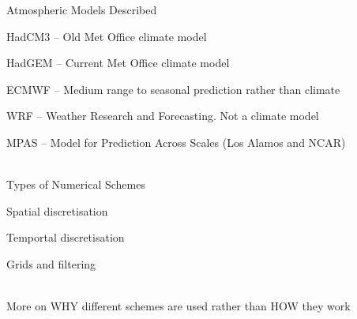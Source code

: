 \begin{slide}{}

{\large\color{purple} Atmospheric Models Described}
\begin{list0}
\item HadCM3 -- Old Met Office climate model
\item HadGEM -- Current Met Office climate model
\item ECMWF -- Medium range to seasonal prediction rather than climate
\item WRF -- Weather Research and Forecasting. Not a climate model
\item MPAS -- Model for Prediction Across Scales (Los Alamos and NCAR)
\end{list0}

\ \\

{\large\color{purple} Types of Numerical Schemes}
\begin{list0}
\item Spatial discretisation
\item Temportal discretisation
\item Grids and filtering
\end{list0}

\ \\
{\large\color{purple} More on WHY different schemes are used rather than HOW they work}

\end{slide}

